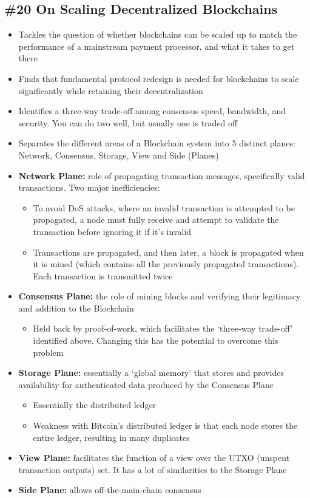 \subsection{\#20 On Scaling Decentralized Blockchains}
\begin{itemize}
	\item Tackles the question of whether blockchains can be scaled up to match the performance of a mainstream payment processor, and what it takes to get there
	\item Finds that fundamental protocol redesign is needed for blockchains to scale significantly while retaining their decentralization
	\item Identifies a three-way trade-off among consensus speed, bandwidth, and security. You can do two well, but usually one is traded off
	\item Separates the different areas of a Blockchain system into 5 distinct planes: Network, Consensus, Storage, View and Side (Planes)
	\item \textbf{Network Plane:} role of propagating transaction messages, specifically valid transactions. Two major inefficiencies:
	\begin{itemize}
		\item To avoid DoS attacks, where an invalid transaction is attempted to be propagated, a node must fully receive and attempt to validate the transaction before ignoring it if it's invalid
		\item Transactions are propagated, and then later, a block is propagated when it is mined (which contains all the previously propagated transactions). Each transaction is transmitted twice
	\end{itemize}
	\item \textbf{Consensus Plane:} the role of mining blocks and verifying their legitimacy and addition to the Blockchain
	\begin{itemize}
		\item Held back by proof-of-work, which facilitates the `three-way trade-off' identified above. Changing this has the potential to overcome this problem
	\end{itemize}
	\item \textbf{Storage Plane:} essentially a `global memory' that stores and provides availability for authenticated data produced by the Consensus Plane
	\begin{itemize}
		\item Essentially the distributed ledger
		\item Weakness with Bitcoin's distributed ledger is that each node stores the entire ledger, resulting in many duplicates
	\end{itemize}
	\item\textbf{View Plane:} facilitates the function of a view over the UTXO (unspent transaction outputs) set. It has a lot of similarities to the Storage Plane
	\item\textbf{Side Plane:} allows off-the-main-chain consensus
\end{itemize}